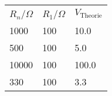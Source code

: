 \begin{tabular}{lll}
\hline
 $R_n$/$\Omega$ & $R_1$/$\Omega$ & $V_\text{Theorie}$ \\
 1000           & 100            & 10.0               \\
 500            & 100            & 5.0                \\
 10000          & 100            & 100.0              \\
 330            & 100            & 3.3                \\
\hline
\end{tabular}